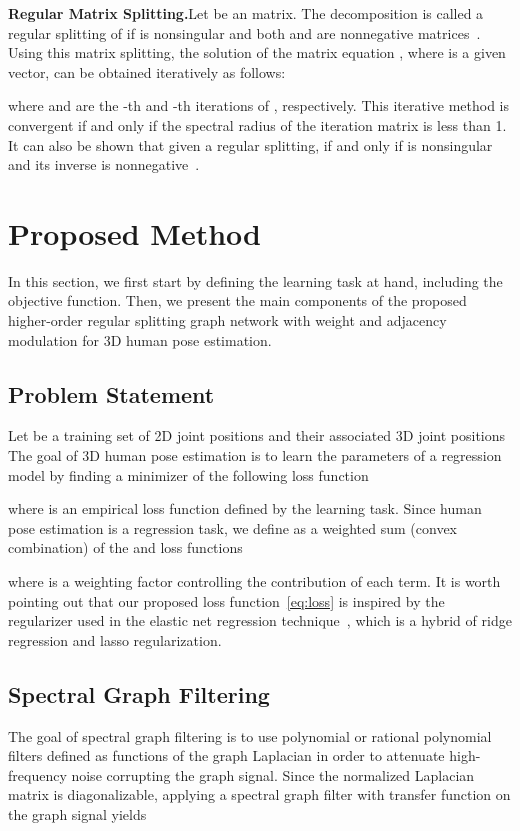 \documentclass[10pt,journal]{IEEEtran}
\begin{document}
\medskip\noindent\textbf{Regular Matrix Splitting.}\quad Let  be an  matrix. The decomposition  is called a regular splitting of  if  is nonsingular and both  and  are nonnegative matrices~\cite{Saad:03}. Using this matrix splitting, the solution of the matrix equation , where  is a given vector, can be obtained iteratively as follows:

where  and  are the -th and -th iterations of , respectively. This iterative method is convergent if and only if the spectral radius of the iteration matrix  is less than 1. It can also be shown that given a regular splitting,  if and only if  is nonsingular and its inverse is nonnegative~\cite{Saad:03}.

	
\section{Proposed Method}
In this section, we first start by defining the learning task at hand, including the objective function. Then, we present the main components of the proposed higher-order regular splitting graph network with weight and adjacency modulation for 3D human pose estimation.

\subsection{Problem Statement}
Let  be a training set of 2D joint positions   and their associated 3D joint positions  The goal of 3D human pose estimation is to learn the parameters  of a regression model  by finding a minimizer of the following loss function

where  is an empirical loss function defined by the learning task. Since human pose estimation is a regression task, we define  as a weighted sum (convex combination) of the  and  loss functions

where  is a weighting factor controlling the contribution of each term. It is worth pointing out that our proposed loss function~\eqref{eq:loss} is inspired by the regularizer used in the elastic net regression technique~\cite{HuiZou:05}, which is a hybrid of ridge regression and lasso regularization.

\subsection{Spectral Graph Filtering}
The goal of spectral graph filtering is to use polynomial or rational polynomial filters defined as functions of the graph Laplacian in order to attenuate high-frequency noise corrupting the graph signal. Since the normalized Laplacian matrix is diagonalizable, applying a spectral graph filter with transfer function  on the graph signal  yields
\end{document}
